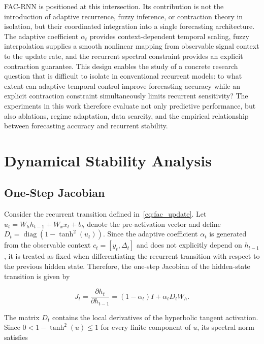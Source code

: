 \documentclass[journal]{IEEEtran}
\begin{document}
FAC-RNN is positioned at this intersection. Its contribution is not the introduction of adaptive recurrence, fuzzy inference, or contraction theory in isolation, but their coordinated integration into a single forecasting architecture. The adaptive coefficient $\alpha_t$ provides context-dependent temporal scaling, fuzzy interpolation supplies a smooth nonlinear mapping from observable signal context to the update rate, and the recurrent spectral constraint provides an explicit contraction guarantee. This design enables the study of a concrete research question that is difficult to isolate in conventional recurrent models: to what extent can adaptive temporal control improve forecasting accuracy while an explicit contraction constraint simultaneously limits recurrent sensitivity? The experiments in this work therefore evaluate not only predictive performance, but also ablations, regime adaptation, data scarcity, and the empirical relationship between forecasting accuracy and recurrent stability.


\section{Dynamical Stability Analysis}
\label{sec:stability}

\subsection{One-Step Jacobian}
\label{subsec:jacobian}

Consider the recurrent transition defined in~\eqref{eq:fac_update}. Let $u_t=W_hh_{t-1}+W_xx_t+b_h$ denote the pre-activation vector and define $D_t=\operatorname{diag}(1-\tanh^2(u_t))$. Since the adaptive coefficient $\alpha_t$ is generated from the observable context $c_t=[y_t,\Delta_t]$ and does not explicitly depend on $h_{t-1}$, it is treated as fixed when differentiating the recurrent transition with respect to the previous hidden state. Therefore, the one-step Jacobian of the hidden-state transition is given by

\begin{equation}
	J_t
	=
	\frac{\partial h_t}{\partial h_{t-1}}
	=
	(1-\alpha_t)I
	+
	\alpha_tD_tW_h.
	\label{eq:jacobian}
\end{equation}

The matrix $D_t$ contains the local derivatives of the hyperbolic tangent activation. Since $0<1-\tanh^2(u)\leq1$ for every finite component of $u$, its spectral norm satisfies
\end{document}
